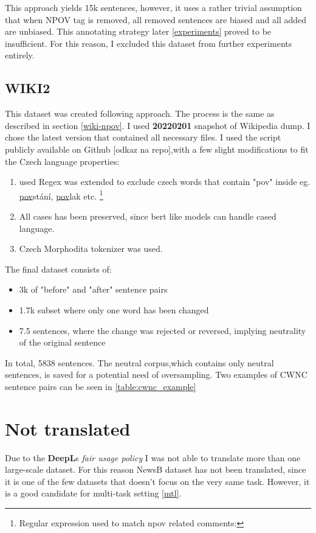 This approach yields 15k sentences, however, it uses a rather trivial assumption that when NPOV tag is removed, all removed sentences are biased and all added are unbiased. This annotating strategy later \ref{experiments} proved to be insufficient. For this reason, I excluded this dataset from further experiments entirely.





\subsection{WIKI2}\label{wncs}
This dataset was created following \cite{pryzant2020automatically} approach. The process is the same as described in section \ref{wiki-npov}. I used \textbf{20220201} snapshot of Wikipedia dump. I chose the latest version that contained all necessary files.
I used the script publicly available on Github [odkaz na repo],with a few slight modifications to fit the Czech language properties:
\begin{enumerate}
    \item used Regex was extended to exclude czech words that contain "pov" inside eg. \underline{pov}stání, \underline{pov}lak etc. \footnote{Regular expression used to match npov related comments: }
    \item All cases has been preserved, since bert like models can handle cased language.
    \item Czech Morphodita tokenizer was used.
\end{enumerate}
\newpage
The final dataset consists of:
\begin{itemize}
    \item 3k of "before" and "after" sentence pairs
    \item 1.7k subset where only one word has been changed
    \item 7.5 sentences, where the change was rejected or reversed, implying neutrality of the original sentence
\end{itemize}

In total, 5838 sentences. The neutral corpus,which contains only neutral sentences, is saved for a potential need of oversampling. Two examples of CWNC sentence pairs can be seen in \ref{table:cwnc_example}






\section{Not translated}
Due to the \textbf{DeepL}s \textit{fair usage policy} I was not able to translate more than one large-scale dataset. For this reason NewsB dataset has not been translated, since it is one of the few datasets that doesn't focus on the very same task. However, it is a good candidate for multi-task setting \ref{mtl}.